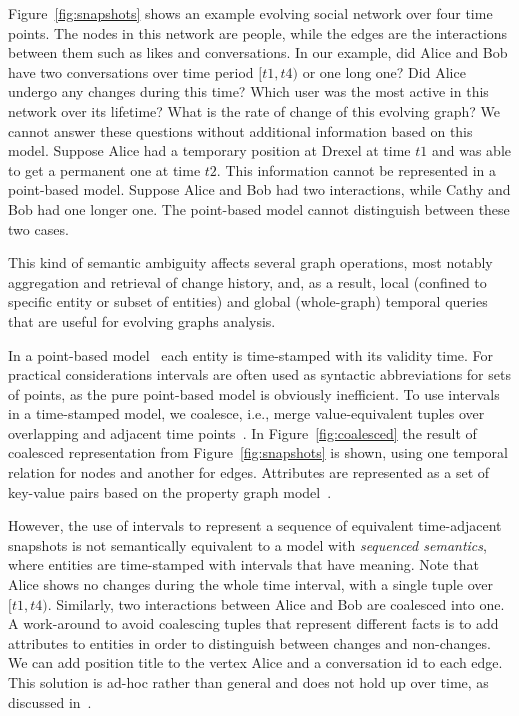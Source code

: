 Figure~\ref{fig:snapshots} shows an example evolving social network
over four time points.  The nodes in this network are people, while
the edges are the interactions between them such as likes and
conversations.  In our example, did Alice and Bob have two
conversations over time period $[t1, t4)$ or one long one?  Did Alice
  undergo any changes during this time? Which user was the most active
  in this network over its lifetime? What is the rate of change of
  this evolving graph?  We cannot answer these questions without
  additional information based on this model.  Suppose Alice had a
  temporary position at Drexel at time $t1$ and was able to get a
  permanent one at time $t2$.  This information cannot be represented
  in a point-based model.  Suppose Alice and Bob had two interactions,
  while Cathy and Bob had one longer one.  The point-based model
  cannot distinguish between these two cases.

This kind of semantic ambiguity affects several graph operations, most
notably aggregation and retrieval of change history, and, as a result,
local (confined to specific entity or subset of entities) and global
(whole-graph) temporal queries that are useful for evolving graphs
analysis.

In a point-based model~\cite{Toman2009} each entity is time-stamped
with its validity time.  For practical considerations intervals are
often used as syntactic abbreviations for sets of points, as the pure
point-based model is obviously inefficient.  To use intervals in a
time-stamped model, we coalesce, i.e., merge value-equivalent tuples
over overlapping and adjacent time points~\cite{Bohlen09}.  In
Figure~\ref{fig:coalesced} the result of coalesced representation from
Figure~\ref{fig:snapshots} is shown, using one temporal relation for
nodes and another for edges.  Attributes are represented as a set of
key-value pairs based on the property graph model~\cite{Angles2008}.

However, the use of intervals to represent a sequence of equivalent
time-adjacent snapshots is not semantically equivalent to a model with
{\em sequenced semantics}, where entities are time-stamped with
intervals that have meaning.  Note that Alice shows no changes during
the whole time interval, with a single tuple over $[t1, t4)$.
  Similarly, two interactions between Alice and Bob are coalesced into
  one.  A work-around to avoid coalescing tuples that represent
  different facts is to add attributes to entities in order to
  distinguish between changes and non-changes.  We can add position
  title to the vertex Alice and a conversation id to each edge.  This
  solution is ad-hoc rather than general and does not hold up over
  time, as discussed in~\cite{Bohlen1998}.

